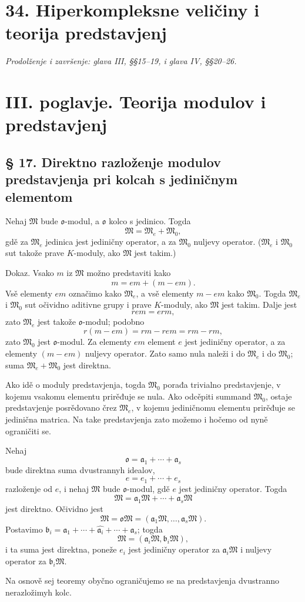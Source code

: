 \documentclass[11pt]{article}
\providecommand{\mo}{\mathfrak{o}}
\providecommand{\ma}{\mathfrak{a}}
\providecommand{\mb}{\mathfrak{b}}
\providecommand{\mM}{\mathfrak{M}}
\begin{document}
\section*{34. Hiperkompleksne veličiny i teorija predstavjenj}
\emph{Prodolženje i završenje: glava III, §§15--19, i glava IV, §§20--26.}

\section*{III. poglavje. Teorija modulov i predstavjenj}

\subsection*{§ 17. Direktno razloženje modulov predstavjenja pri kolcah s jediničnym elementom}

Nehaj $\mM$ bude $\mo$-modul, a $\mo$ kolco s jedinico. Togda
\[
        \mM=\mM_e+\mM_0,
\]
gdě za $\mM_e$ jedinica jest jediničny operator, a za $\mM_0$ nuljevy operator. ($\mM_e$ i $\mM_0$ sut takože prave $K$-moduly, ako $\mM$ jest takim.)

Dokaz. Vsako $m$ iz $\mM$ možno predstaviti kako
\[
        m=em+(m-em).
\]
Vsě elementy $em$ označimo kako $\mM_e$, a vsě elementy $m-em$ kako $\mM_0$. Togda $\mM_e$ i $\mM_0$ sut očividno aditivne grupy i prave $K$-moduly, ako $\mM$ jest takim. Dalje jest
\[
        r em=erm,
\]
zato $\mM_e$ jest takože $\mo$-modul; podobno
\[
        r(m-em)=rm-rem=rm-rm,
\]
zato $\mM_0$ jest $\mo$-modul. Za elementy $em$ element $e$ jest jediničny operator, a za elementy $(m-em)$ nuljevy operator. Zato samo nula naleži i do $\mM_e$ i do $\mM_0$; suma $\mM_e+\mM_0$ jest direktna.

Ako idě o moduly predstavjenja, togda $\mM_0$ porađa trivialno predstavjenje, v kojemu vsakomu elementu prirěđuje se nula. Ako odcěpiti summand $\mM_0$, ostaje predstavjenje posrědovano črez $\mM_e$, v kojemu jediničnomu elementu prirěđuje se jedinična matrica. Na take predstavjenja zato možemo i hočemo od nyně ograničiti se.

Nehaj
\[
        \mo=\ma_1+\cdots+\ma_s
\]
bude direktna suma dvustrannyh idealov,
\[
        e=e_1+\cdots+e_s
\]
razloženje od $e$, i nehaj $\mM$ bude $\mo$-modul, gdě $e$ jest jediničny operator. Togda
\[
        \mM=\ma_1\mM+\cdots+\ma_s\mM
\]
jest direktno. Očividno jest
\[
        \mM=\mo\mM=(\ma_1\mM,\ldots,\ma_s\mM).
\]
Postavimo $\mb_i=\ma_1+\cdots+\widehat{\ma_i}+\cdots+\ma_s$; togda
\[
        \mM=(\ma_i\mM,\mb_i\mM),
\]
i ta suma jest direktna, poneže $e_i$ jest jediničny operator za $\ma_i\mM$ i nuljevy operator za $\mb_i\mM$.

Na osnově sej teoremy obyčno ograničujemo se na predstavjenja dvustranno nerazložimyh kolc.
\end{document}
